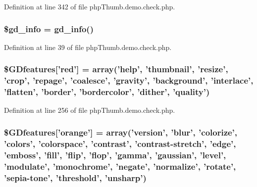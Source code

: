 \-Definition at line 342 of file php\-Thumb.\-demo.\-check.\-php.

\hypertarget{php_thumb_8demo_8check_8php_af2c7b7086347d2db2cbba6ff28df96e7}{
\subsubsection[{\$gd\-\_\-info}]{\setlength{\rightskip}{0pt plus 5cm}\$gd\-\_\-info = gd\-\_\-info()}}\label{php_thumb_8demo_8check_8php_af2c7b7086347d2db2cbba6ff28df96e7}


\-Definition at line 39 of file php\-Thumb.\-demo.\-check.\-php.

\hypertarget{php_thumb_8demo_8check_8php_ab45b8bde8535f30f866c05e15aa29993}{
\subsubsection[{\$\-G\-Dfeatures}]{\setlength{\rightskip}{0pt plus 5cm}\$\-G\-Dfeatures\mbox{[}'red'\mbox{]} = array('help', 'thumbnail', 'resize', 'crop', 'repage', 'coalesce', 'gravity', 'background', 'interlace', 'flatten', 'border', 'bordercolor', 'dither', 'quality')}}\label{php_thumb_8demo_8check_8php_ab45b8bde8535f30f866c05e15aa29993}


\-Definition at line 256 of file php\-Thumb.\-demo.\-check.\-php.

\hypertarget{php_thumb_8demo_8check_8php_aa39d69ebc927d9cbbd26707a8142fd74}{
\subsubsection[{\$\-G\-Dfeatures}]{\setlength{\rightskip}{0pt plus 5cm}\$\-G\-Dfeatures\mbox{[}'orange'\mbox{]} = array('version', 'blur', 'colorize', 'colors', 'colorspace', 'contrast', 'contrast-\/stretch', 'edge', 'emboss', 'fill', 'flip', 'flop', 'gamma', 'gaussian', 'level', 'modulate', 'monochrome', 'negate', 'normalize', 'rotate', 'sepia-\/tone', 'threshold', 'unsharp')}}\label{php_thumb_8demo_8check_8php_aa39d69ebc927d9cbbd26707a8142fd74}


